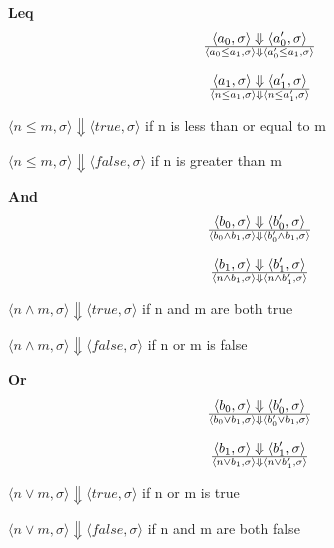 \documentclass{article}
\begin{document}
\bigskip

\begin{minipage}[t]{0.9\textwidth}
  \textbf{Leq}
  $$
  \langle a_0, \sigma \rangle \Downarrow \langle a_0', \sigma \rangle \over
  \langle a_0 \leq a_1, \sigma \rangle \Downarrow \langle a_0' \leq a_1, \sigma \rangle
  $$
  
  $$
  \langle a_1, \sigma \rangle \Downarrow \langle a_1', \sigma \rangle \over
  \langle n \leq a_1, \sigma \rangle \Downarrow \langle n \leq a_1', \sigma \rangle
  $$
  
  \centering
  $
  \langle n \leq m, \sigma \rangle \Downarrow \langle true, \sigma \rangle
  $ \hspace{5mm} if n is less than or equal to m

  \centering
  $
  \langle n \leq m, \sigma \rangle \Downarrow \langle false, \sigma \rangle 
  $ \hspace{5mm} if n is greater than m
\end{minipage}

\bigskip

\begin{minipage}[t]{0.9\textwidth}
  \textbf{And}
  $$
  \langle b_0, \sigma \rangle \Downarrow \langle b_0', \sigma \rangle \over
  \langle b_0 \land b_1, \sigma \rangle \Downarrow \langle b_0' \land b_1, \sigma \rangle
  $$
  
  $$
  \langle b_1, \sigma \rangle \Downarrow \langle b_1', \sigma \rangle \over
  \langle n \land b_1, \sigma \rangle \Downarrow \langle n \land b_1', \sigma \rangle
  $$
  
  \centering
  $
  \langle n \land m, \sigma \rangle \Downarrow \langle true, \sigma \rangle
  $ \hspace{5mm} if n and m are both true

  \centering
  $
  \langle n \land m, \sigma \rangle \Downarrow \langle false, \sigma \rangle
  $ \hspace{5mm} if n or m is false
\end{minipage}

\bigskip

\begin{minipage}[t]{0.9\textwidth}
  \textbf{Or}
  $$
  \langle b_0, \sigma \rangle \Downarrow \langle b_0', \sigma \rangle \over
  \langle b_0 \lor b_1, \sigma \rangle \Downarrow \langle b_0' \lor b_1, \sigma \rangle
  $$
  
  $$
  \langle b_1, \sigma \rangle \Downarrow \langle b_1', \sigma \rangle \over
  \langle n \lor b_1, \sigma \rangle \Downarrow \langle n \lor b_1', \sigma \rangle
  $$
  
  \centering
  $
  \langle n \lor m, \sigma \rangle \Downarrow \langle true, \sigma \rangle
  $ \hspace{5mm} if n or m is true

  \centering
  $
  \langle n \lor m, \sigma \rangle \Downarrow \langle false, \sigma \rangle
  $ \hspace{5mm} if n and m are both false
\end{minipage}
\end{document}
